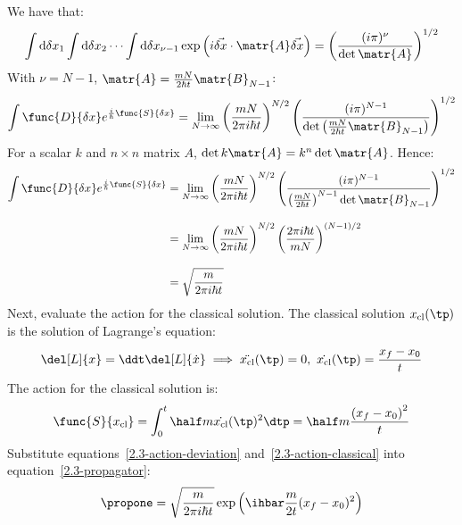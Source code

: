 We have that:
\begin{equation}
  \label{2.3-integral}
  \int\dxd{1}\int\dxd{2}\cdots\int\dxd{\nu-1}
  \exp\left(i\vec{\xd}\cdot\matr{A}\vec{\xd}\right)
  =
  \left(\frac{(i\pi)^\nu}{\det\matr{A}}\right)^{1/2}
\end{equation}
With $\nu = N-1$, $\matr{A} = \frac{mN}{2\hbar t} \matr{B}_{N-1}$:
\begin{equation*}
  \int \func{D}{\xd} e^{\frac{i}{\hbar} \func{S}{\xd}}
  =
  \lim_{N \to \infty}
  \left(\frac{mN}{2\pi i\hbar t}\right)^{N/2}
  \left(\frac{(i\pi)^{N-1}}{\det\left(\frac{mN}{2\hbar t}\matr{B}_{N-1}\right)}\right)^{1/2}
\end{equation*}
For a scalar $k$ and $n\times n$ matrix $A$, $\det k\matr{A} = k^n
  \det\matr{A}$.
Hence:
\begin{align}
  \int \func{D}{\xd} e^{\frac{i}{\hbar} \func{S}{\xd}}
   & =
  \lim_{N \to \infty}
  \left(\frac{mN}{2\pi i\hbar t}\right)^{N/2}
  \left(\frac{(i\pi)^{N-1}}{\left(\frac{mN}{2\hbar t}\right)^{N-1}\det\matr{B}_{N-1}}\right)^{1/2}
  \nonumber
  \\[2ex]
   & =
  \lim_{N \to \infty}
  \left(\frac{mN}{2\pi i\hbar t}\right)^{N/2}
  \left(\frac{2\pi i\hbar t}{mN}\right)^{(N-1)/2}
  \nonumber
  \\[2ex]
  \label{2.3-action-deviation}
   & =
  \sqrt{\frac{m}{2\pi i\hbar t}}
\end{align}
Next, evaluate the action for the classical solution.
The classical solution $\xcl(\tp)$ is the solution of Lagrange's equation:
\begin{equation*}
  \del[L]{x} = \ddt\del[L]{\dot{x}}
  \implies
  \ddot{\xcl}(\tp) = 0,\
  \dot{\xcl}(\tp) = \frac{x_f - x_0}{t}
\end{equation*}
The action for the classical solution is:
\begin{equation}
  \label{2.3-action-classical}
  \func{S}{\xcl} = \int_{0}^{t} \half m \dot{\xcl}(\tp)^2 \dtp
  = \half m \frac{\left(x_f - x_0\right)^2}{t}
\end{equation}
Substitute equations~\ref{2.3-action-deviation} and~\ref{2.3-action-classical}
into equation~\ref{2.3-propagator}:
\begin{equation}
  \label{2.3-result}
  \propone = \sqrt{\frac{m}{2\pi i\hbar t}}\exp\left(\ihbar\frac{m}{2t}(x_f - x_0)^2\right)
\end{equation}
